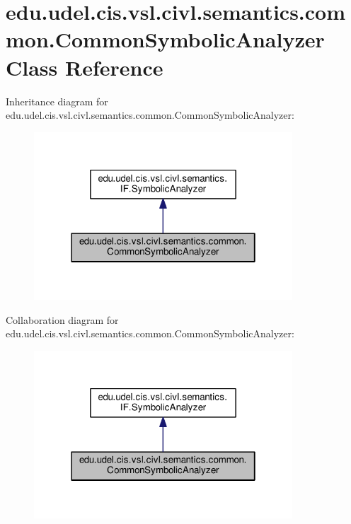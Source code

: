 \hypertarget{classedu_1_1udel_1_1cis_1_1vsl_1_1civl_1_1semantics_1_1common_1_1CommonSymbolicAnalyzer}{}\section{edu.\+udel.\+cis.\+vsl.\+civl.\+semantics.\+common.\+Common\+Symbolic\+Analyzer Class Reference}
\label{classedu_1_1udel_1_1cis_1_1vsl_1_1civl_1_1semantics_1_1common_1_1CommonSymbolicAnalyzer}


Inheritance diagram for edu.\+udel.\+cis.\+vsl.\+civl.\+semantics.\+common.\+Common\+Symbolic\+Analyzer\+:
\nopagebreak
\begin{figure}[H]
\begin{center}
\leavevmode
\includegraphics[width=274pt]{classedu_1_1udel_1_1cis_1_1vsl_1_1civl_1_1semantics_1_1common_1_1CommonSymbolicAnalyzer__inherit__graph}
\end{center}
\end{figure}


Collaboration diagram for edu.\+udel.\+cis.\+vsl.\+civl.\+semantics.\+common.\+Common\+Symbolic\+Analyzer\+:
\nopagebreak
\begin{figure}[H]
\begin{center}
\leavevmode
\includegraphics[width=274pt]{classedu_1_1udel_1_1cis_1_1vsl_1_1civl_1_1semantics_1_1common_1_1CommonSymbolicAnalyzer__coll__graph}
\end{center}
\end{figure}
